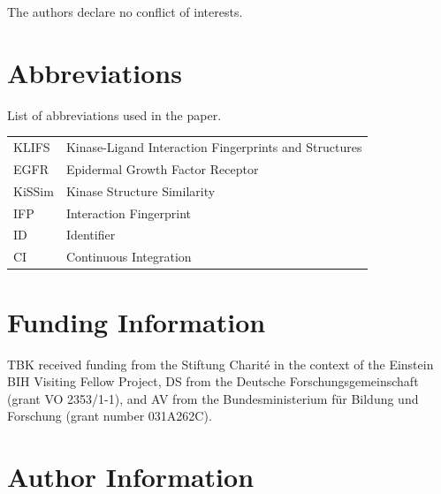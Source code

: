 \documentclass[9pt,training]{livecoms}
\begin{document}
The authors declare no conflict of interests.

\section*{Abbreviations}
List of abbreviations used in the paper.
\begin{table}[H]
    \centering
    \begin{tabular}{l l}
        KLIFS & Kinase-Ligand Interaction Fingerprints and Structures\\
        EGFR & Epidermal Growth Factor Receptor\\
        KiSSim & Kinase Structure Similarity\\
        IFP & Interaction Fingerprint \\
        ID & Identifier\\
        CI & Continuous Integration
    \end{tabular}
\end{table}


\section*{Funding Information}
TBK received funding from the Stiftung Charit\'e in the context of the Einstein BIH Visiting Fellow Project, DS from the Deutsche Forschungsgemeinschaft (grant VO 2353/1-1), and AV from the Bundesministerium f\"ur Bildung und Forschung (grant number 031A262C).

\section*{Author Information}
\makeorcid




\end{document}
